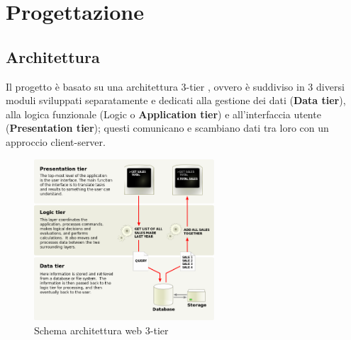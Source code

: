 
\chapter{Progettazione}


\section{Architettura} \label{sec:architettura}
Il progetto è basato su una architettura 3-tier \cite{wiki:3-tier-architecture},
ovvero è suddiviso in 3 diversi moduli sviluppati separatamente e dedicati alla
gestione dei dati (\textbf{Data tier}), alla logica funzionale (Logic o
\textbf{Application tier}) e all'interfaccia utente (\textbf{Presentation tier});
questi comunicano e scambiano dati tra loro con un approccio client-server.

\begin{figure}[ht]
	\centering
	\includegraphics[width=0.6\textwidth]{assets/diagrams/3-tier-architecture.png}
	\caption{Schema architettura web 3-tier}
	\label{fig:3-tier-architecture}
\end{figure}

